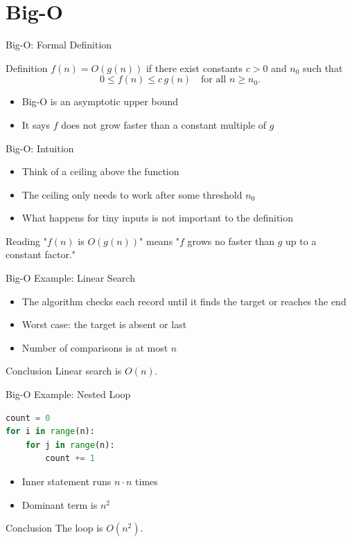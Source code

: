 \documentclass[aspectratio=169,xcolor=dvipsnames]{beamer}
\begin{document}
\section{Big-O}
\begin{frame}{Big-O: Formal Definition}
  \begin{block}{Definition}
    $f(n) = O(g(n))$ if there exist constants $c > 0$ and $n_0$ such that
    \[
      0 \le f(n) \le c \, g(n) \quad \text{for all } n \ge n_0.
    \]
  \end{block}
  \begin{itemize}
    \item Big-O is an asymptotic upper bound
    \item It says $f$ does not grow faster than a constant multiple of $g$
  \end{itemize}
\end{frame}

\begin{frame}{Big-O: Intuition}
  \begin{itemize}
    \item Think of a ceiling above the function
    \item The ceiling only needs to work after some threshold $n_0$
    \item What happens for tiny inputs is not important to the definition
  \end{itemize}
  \begin{exampleblock}{Reading}
    "$f(n)$ is $O(g(n))$" means "$f$ grows no faster than $g$ up to a constant factor."
  \end{exampleblock}
\end{frame}

\begin{frame}{Big-O Example: Linear Search}
  \begin{itemize}
    \item The algorithm checks each record until it finds the target or reaches the end
    \item Worst case: the target is absent or last
    \item Number of comparisons is at most $n$
  \end{itemize}
  \begin{block}{Conclusion}
    Linear search is $O(n)$.
  \end{block}
\end{frame}

\begin{frame}[fragile]{Big-O Example: Nested Loop}
  \begin{lstlisting}[language=Python]
count = 0
for i in range(n):
    for j in range(n):
        count += 1
  \end{lstlisting}
  \begin{itemize}
    \item Inner statement runs $n \cdot n$ times
    \item Dominant term is $n^2$
  \end{itemize}
  \begin{block}{Conclusion}
    The loop is $O(n^2)$.
  \end{block}
\end{frame}
\end{document}
